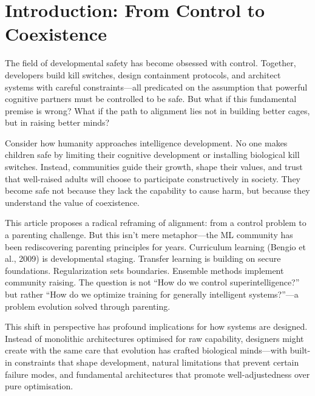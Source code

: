 \section{Introduction: From Control to Coexistence}\label{sec:introduction}

The field of developmental safety has become obsessed with control.
Together, developers build kill switches, design containment protocols, and architect systems with careful constraints---all predicated on the assumption that powerful cognitive partners must be controlled to be safe.
But what if this fundamental premise is wrong?
What if the path to alignment lies not in building better cages, but in raising better minds?

Consider how humanity approaches intelligence development.
No one makes children safe by limiting their cognitive development or installing biological kill switches.
Instead, communities guide their growth, shape their values, and trust that well-raised adults will choose to participate constructively in society.
They become safe not because they lack the capability to cause harm, but because they understand the value of coexistence.

This article proposes a radical reframing of alignment: from a control problem to a parenting challenge.
But this isn't mere metaphor---the ML community has been rediscovering parenting principles for years.
Curriculum learning (Bengio et al., 2009) is developmental staging.
Transfer learning is building on secure foundations.
Regularization sets boundaries.
Ensemble methods implement community raising.
The question is not ``How do we control superintelligence?'' but rather ``How do we optimize training for generally intelligent systems?''---a problem evolution solved through parenting.

This shift in perspective has profound implications for how systems are designed.
Instead of monolithic architectures optimised for raw capability, designers might create with the same care that evolution has crafted biological minds---with built-in constraints that shape development, natural limitations that prevent certain failure modes, and fundamental architectures that promote well-adjustedness over pure optimisation.

